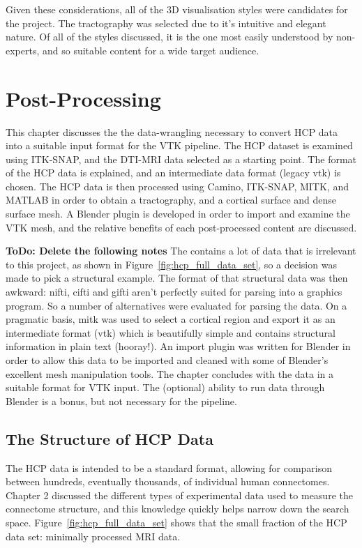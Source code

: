 \documentclass[MSc,paper=a4,pagesize=auto]{icldt}
\begin{document}
Given these considerations, all of the 3D visualisation styles were candidates for the project. The tractography was selected due to it's intuitive and elegant nature. Of all of the styles discussed, it is the one most easily understood by non-experts, and so suitable content for a wide target audience.

\chapter{Post-Processing}

This chapter discusses the the data-wrangling necessary to convert HCP data into a suitable input format for the VTK pipeline. The HCP dataset is examined using ITK-SNAP, and the DTI-MRI data selected as a starting point. The format of the HCP data is explained, and an intermediate data format (legacy vtk) is chosen. The HCP data is then processed using Camino, ITK-SNAP, MITK, and MATLAB in order to obtain a tractography, and a cortical surface and dense surface mesh. A Blender plugin is developed in order to import and examine the VTK mesh, and the relative benefits of each post-processed content are discussed.  

\textbf{ToDo: Delete the following notes}
The contains a lot of data that is irrelevant to this project, as shown in Figure~\ref{fig:hcp_full_data_set}, so a decision was made to pick a structural example.  The format of that structural data was then awkward: nifti, cifti and gifti aren't perfectly suited for parsing into a graphics program. So a number of alternatives were evaluated for parsing the data. On a pragmatic basis, mitk was used to select a cortical region and export it as an intermediate format (vtk) which is beautifully simple and contains structural information in plain text (hooray!). An import plugin was written for Blender in order to allow this data to be imported and cleaned with some of Blender's excellent mesh manipulation tools. The chapter concludes with the data in a suitable format for VTK input. The (optional) ability to run data through Blender is a bonus, but not necessary for the pipeline.

\section{The Structure of HCP Data} \label{sec:the_structure_of_hcp_data}
The HCP data is intended to be a standard format, allowing for comparison between hundreds, eventually thousands, of individual human connectomes. Chapter 2 discussed the different types of experimental data used to measure the connectome structure, and this knowledge quickly helps narrow down the search space. Figure~\ref{fig:hcp_full_data_set} shows that the small fraction of the HCP data set: minimally processed MRI data.  
\end{document}
